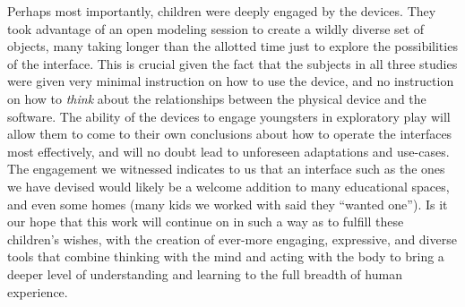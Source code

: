 Perhaps most importantly, children were deeply engaged by the devices. They took
advantage of an open modeling session to create a wildly diverse set of objects,
many taking longer than the allotted time just to explore the possibilities of
the interface. This is crucial given the fact that the subjects in all three
studies were given very minimal instruction on how to use the device, and no
instruction on how to \emph{think} about the relationships between the physical
device and the software. The ability of the devices to engage youngsters in
exploratory play will allow them to come to their own conclusions about how to
operate the interfaces most effectively, and will no doubt lead to unforeseen
adaptations and use-cases. The engagement we witnessed indicates to us that an
interface such as the ones we have devised would likely be a welcome addition to
many educational spaces, and even some homes (many kids we worked with said they
``wanted one''). Is it our hope that this work will continue on in such a way as to
fulfill these children's wishes, with the creation of ever-more engaging,
expressive, and diverse tools that combine thinking with the mind and acting
with the body to bring a deeper level of understanding and learning to the full
breadth of human experience.

